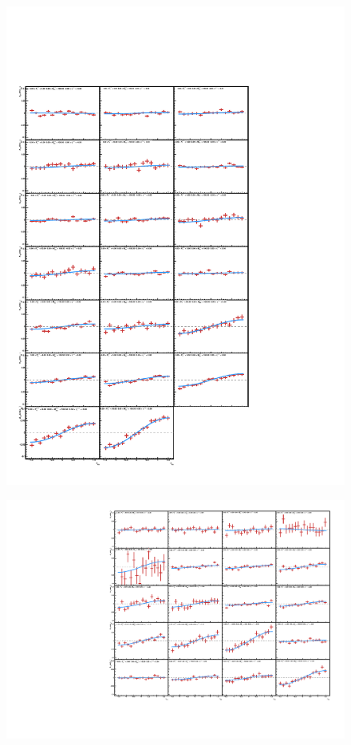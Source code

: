 \documentclass[letterpaper, abstract = on,listof=totoc, bibliography=totoc]{scrreprt}
\begin{document}
\begin{appendices}
\begin{figure}
\begin{center}
\includegraphics[width = .75\textwidth]{2dPtEta.pdf}
\caption[]{}
\label{}
\end{center}
\end{figure}

\begin{figure}
\begin{center}
\includegraphics[width = 1\textwidth]{2dPtMass_hiEta.pdf}
\caption[]{}
\label{}
\end{center}
\end{figure}



\end{appendices}
\end{document}

